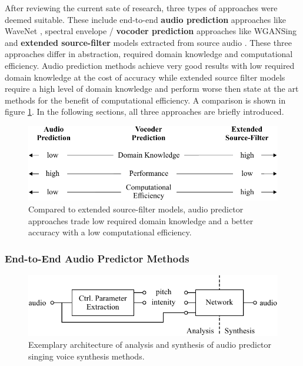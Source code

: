 \documentclass{article}
\begin{document}
After reviewing the current sate of research, three types of approaches were deemed suitable. These include end-to-end \textbf{audio prediction} approaches like WaveNet \cite{oord_wavenet:_2016}, spectral envelope / \textbf{vocoder prediction} approaches like WGANSing \cite{chandna_wgansing:_2019} and \textbf{extended source-filter} models extracted from source audio \cite{schleusing_joint_2013}. These three  approaches differ in abstraction, required domain knowledge and computational efficiency. Audio prediction methods achieve very good results with low required domain knowledge at the cost of accuracy while extended source filter models require a high level of domain knowledge and perform worse then state at the art methods for the benefit of computational efficiency. A comparison is shown in figure \ref{fig:method_comparison}. In the following sections, all three approaches are briefly introduced. 

\begin{figure}[H]
    \centering
    \includegraphics{Graphics/006_method_compairson.pdf}
    \caption{Compared to extended source-filter models, audio predictor approaches trade low required domain knowledge and a better accuracy with a low computational efficiency.}
    \label{fig:method_comparison}
\end{figure}

\subsubsection*{End-to-End Audio Predictor Methods}

\begin{figure}[H]
    \centering
    \includegraphics{Graphics/007_method_audio_predictor.pdf}
    \caption{Exemplary architecture of analysis and synthesis of audio predictor  singing voice synthesis methods.}
    \label{fig:method_audio_predictor}
\end{figure}
\end{document}
